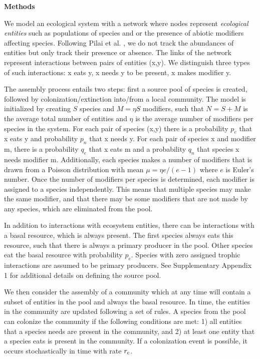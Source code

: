 \documentclass[twocolumn,preprintnumbers,amsmath,amssymb,superscriptaddress,linenumbers]{revtex4-1}
\newcommand{\rr}[1]{{\rm #1}}
\begin{document}
\vspace{-2mm}
\noindent \textbf{Methods}\\
  \footnotesize{
  We model an ecological system with a network where nodes represent \emph{ecological entities} such as populations of species and or the presence of abiotic modifiers affecting species.
  Following Pilai et al. \cite{Pillai2011}, we do not track the abundances of entities but only track their presence or absence.
  The links of the network represent interactions between pairs of entities (x,y).
  We distinguish three types of such interactions: x eats y, x needs y to be present, x makes modifier y.

  The assembly process entails two steps: first a source pool of species is created, followed by colonization/extinction into/from a local community.
  The model is initialized by creating $S$ species and $M = \eta S$ modifiers, such that $N=S+M$ is the average total number of entities and $\eta$ is the average number of modifiers per species in the system.
  For each pair of species (x,y) there is a probability $p_e$ that x eats y and probability $p_n$ that x needs y.
  For each pair of species x and modifier m, there is a probability $q_e$ that x eats m and a probability $q_n$ that species x needs modifier m.
  Additionally, each species makes a number of modifiers that is drawn from a Poisson distribution with mean $\mu = \eta e/(e-1)$ where $e$ is Euler's number.
  Once the number of modifiers per species is determined, each modifier is assigned to a species independently.
  This means that multiple species may make the same modifier, and that there may be some modifiers that are not made by any species, which are eliminated from the pool.

  In addition to interactions with ecosystem entities, there can be interactions with a basal resource, which is always present.
  The first species always eats this resource, such that there is always a primary producer in the pool.
  Other species eat the basal resource with probability $p_e$.
  Species with zero assigned trophic interactions are assumed to be primary producers.
  See Supplementary Appendix 1 for additional details on defining the source pool.

  We then consider the assembly of a community which at any time will contain a subset of entities in the pool and always the basal resource.
  In time, the entities in the community are updated following a set of rules.
  A species from the pool can colonize the community if the following conditions are met:
  1) all entities that a species needs are present in the community, and
  2) at least one entity that a species eats is present in the community.
  If a colonization event is possible, it occurs stochastically in time with rate $r_\rr{c}$.

}
\end{document}
